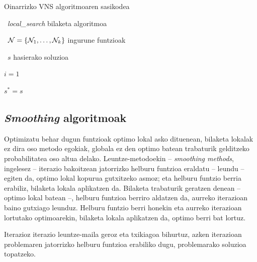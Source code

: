 \documentclass[eu]{ifirak}\usepackage[]{graphicx}\usepackage[]{color}
\begin{document}
\begin{ifalgorithm} [t]
\begin{ifpseudo}{Oinarrizko VNS algoritmoaren sasikodea}
\item \In\ \textit{local\_search} bilaketa algoritmoa
\item \In\ $\mathbf{\cal N} = \{{\cal N}_1,\ldots,{\cal N}_k\}$ ingurune funtzioak
\item \In\ $s$ hasierako soluzioa
\item  $i=1$
\item  $s^* = s$
\item {} \Do
\item {}
\item {}
\item {}
\item {}
\item {}
\item \T{\Else}
\item {}
\item \T{\EIf}
\item \Done
\end{ifpseudo}
\caption{VNS algoritmoaren sasikodea}\label{alg:VNS}
\end{ifalgorithm}


\subsection{\textit{Smoothing} algoritmoak}

Optimizatu behar dugun funtzioak optimo lokal asko dituenean, bilaketa lokalak ez dira oso metodo egokiak, globala ez den optimo batean trabaturik gelditzeko probabilitatea oso altua delako. Leuntze-metodoekin -- \textit{smoothing methods}, ingelesez -- iterazio bakoitzean jatorrizko helburu funtzioa eraldatu -- leundu -- egiten da, optimo lokal kopurua gutxitzeko asmoz; eta helburu funtzio berria erabiliz, bilaketa lokala aplikatzen da. Bilaketa trabaturik geratzen denean -- optimo lokal batean --, helburu funtzioa berriro aldatzen da, aurreko iterazioan baino gutxiago leunduz. Helburu funtzio berri honekin eta aurreko iterazioan lortutako optimoarekin, bilaketa lokala aplikatzen da, optimo berri bat lortuz. 

Iterazioz iterazio leuntze-maila geroz eta txikiagoa bihurtuz, azken iterazioan problemaren jatorrizko helburu funtzioa erabiliko dugu, problemarako soluzioa topatzeko. 
\end{document}
